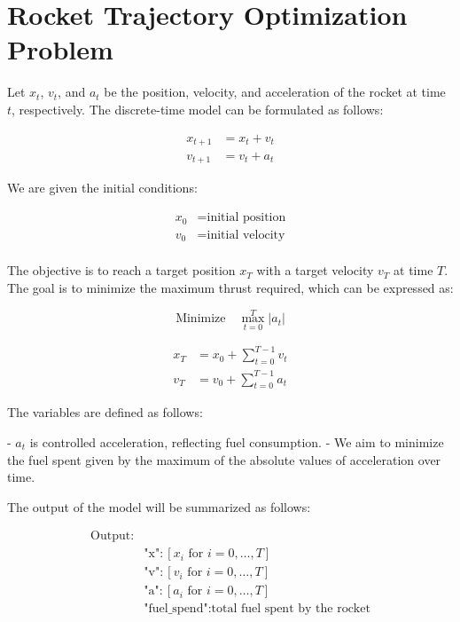\documentclass{article}
\begin{document}
\section*{Rocket Trajectory Optimization Problem}

Let \( x_t \), \( v_t \), and \( a_t \) be the position, velocity, and acceleration of the rocket at time \( t \), respectively. The discrete-time model can be formulated as follows:

\begin{align}
    x_{t+1} &= x_t + v_t \\
    v_{t+1} &= v_t + a_t
\end{align}

We are given the initial conditions:

\begin{align*}
    x_0 & = \text{initial position} \\
    v_0 & = \text{initial velocity} \\
\end{align*}

The objective is to reach a target position \( x_T \) with a target velocity \( v_T \) at time \( T \). The goal is to minimize the maximum thrust required, which can be expressed as:

\[
\text{Minimize} \quad \max_{t=0}^{T} |a_t|
\]


\begin{align}
    x_T &= x_0 + \sum_{t=0}^{T-1} v_t \\
    v_T &= v_0 + \sum_{t=0}^{T-1} a_t
\end{align}

The variables are defined as follows:

- \( a_t \) is controlled acceleration, reflecting fuel consumption.
- We aim to minimize the fuel spent given by the maximum of the absolute values of acceleration over time.

The output of the model will be summarized as follows:

\begin{align*}
    \text{Output:} \\
    & \text{"x"}: [x_i \text{ for } i = 0, \ldots, T] \\
    & \text{"v"}: [v_i \text{ for } i = 0, \ldots, T] \\
    & \text{"a"}: [a_i \text{ for } i = 0, \ldots, T] \\
    & \text{"fuel\_spend"}: \text{total fuel spent by the rocket}
\end{align*}
\end{document}
